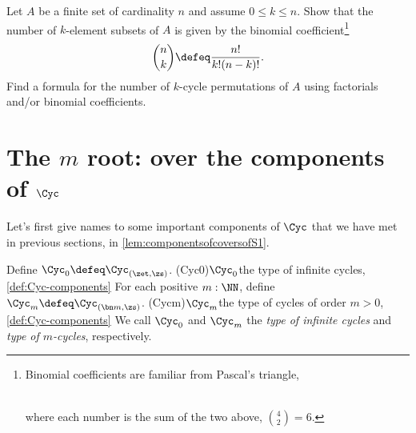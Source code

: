 \begin{xca}
  Let $A$ be a finite set of cardinality $n$ and assume $0\le k \le n$.
  Show that the number of $k$-element subsets of $A$ is given by the
  binomial coefficient\footnote{%
    Binomial coefficients are familiar from Pascal's triangle,\\
    \\
    \noindent where each number is the sum of the two above, \eg $\binom42 = 6$.}
  \[
    \binom nk \defeq \frac{n!}{k!(n-k)!}.
  \]
  Find a formula for the number of $k$-cycle permutations of $A$
  using factorials and/or binomial coefficients.
\end{xca}

\section{The \texorpdfstring{$m$\th}{mᵗʰ} root:
  \coverings over the components of $\Cyc$}
  \label{sec:mthroot}

Let's first give names to some important components of $\Cyc$ that
we have met in previous sections, \eg in \cref{lem:componentsofcoversofS1}.

\begin{definition}\label{def:Cyc-components}
Define $\Cyc_0 \defeq \Cyc_{(\zet,\zs)}$.
\glossary(Cyc0){$\protect\Cyc_0$}{the type of infinite cycles,
\cref{def:Cyc-components}} 
For each positive $m:\NN$, define $\Cyc_m \defeq \Cyc_{(\bn m,\zs)}$.
\glossary(Cycm){$\protect\Cyc_m$}{the type of cycles of order $m>0$,
\cref{def:Cyc-components}} 
We call $\Cyc_0$ and $\Cyc_m$ the \emph{type of infinite cycles}
and \emph{type of $m$-cycles}, respectively.
\end{definition}

